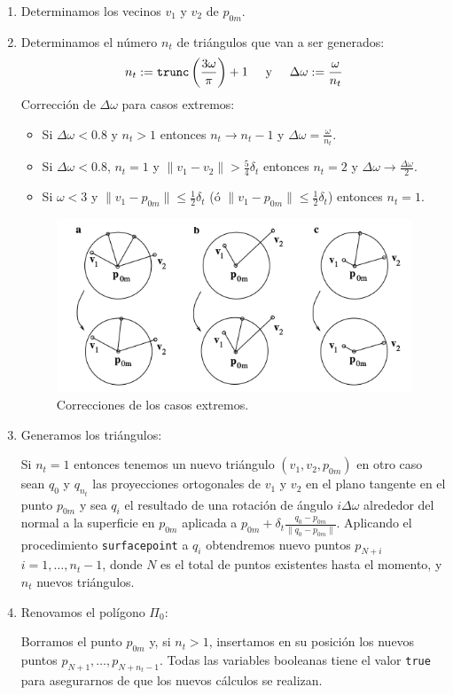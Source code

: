 \begin{enumerate}
\item Determinamos los vecinos $v_1$ y $v_2$ de $p_{0m}$.
\item Determinamos el número $n_t$ de triángulos que van a ser generados:
$$n_t := \mathtt{trunc}\left( \frac{3\omega}{\pi} \right) + 1 \hspace{0.5cm} \text{y} \hspace{0.5cm} \Delta \omega := \frac{\omega}{n_t}$$
Corrección de $\Delta \omega$ para casos extremos:
\begin{itemize}
\item Si $\Delta \omega < 0.8$ y $n_t > 1$ entonces $n_t \to n_t - 1$ y $\Delta \omega = \frac{\omega}{n_t}$.
\item Si $\Delta \omega < 0.8$, $n_t = 1$ y $\| v_1 - v_2 \| > \frac{5}{4} \delta_t$ entonces $n_t = 2$ y $\Delta \omega \to \frac{\Delta \omega}{2}$.
\item Si $\omega < 3$ y $\| v_1 - p_{0m} \| \leq \frac{1}{2} \delta_t$ (ó $\| v_1 - p_{0m} \| \leq \frac{1}{2} \delta_t$) entonces $n_t = 1$.
\end{itemize}

\begin{figure}[h]
\centering
\includegraphics[scale=0.5]{images/hartmann5.png}
\caption{Correcciones de los casos extremos.}
\end{figure}

\item Generamos los triángulos:

Si $n_t = 1$ entonces tenemos un nuevo triángulo $(v_1, v_2, p_{0m})$ en otro caso sean $q_0$ y $q_{n_t}$ las proyecciones ortogonales de $v_1$ y $v_2$ en el plano tangente en el punto $p_{0m}$ y sea $q_i$ el resultado de una rotación de ángulo $i \Delta \omega$ alrededor del normal a la superficie en $p_{0m}$ aplicada a $p_{0m} + \delta_t \frac{q_0 - p_{0m}}{\| q_0 - p_{0m} \|}$. Aplicando el procedimiento \texttt{surfacepoint} a $q_i$ obtendremos nuevo puntos $p_{N+i}$ $i = 1, \dotso, n_t -1$, donde $N$ es el total de puntos existentes hasta el momento, y $n_t$ nuevos triángulos.

\item Renovamos el polígono $\Pi_0$:

Borramos el punto $p_{0m}$ y, si $n_t > 1$, insertamos en su posición los nuevos puntos $p_{N+1}, \dotso, p_{N+n_t-1}$. Todas las variables booleanas tiene el valor \texttt{true} para asegurarnos de que los nuevos cálculos se realizan.
\end{enumerate}
\newpage
